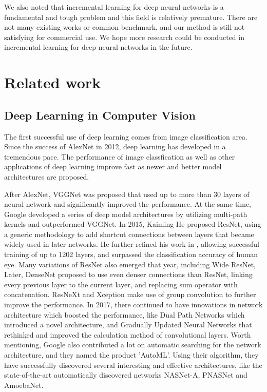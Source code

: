 We also noted that incremental learning for deep neural networks is a fundamental and tough problem and this field is relatively premature. There are not many existing works or common benchmark, and our method is still not satisfying for commercial use. We hope more research could be conducted in incremental learning for deep neural networks in the future.
\section{Related work}
\subsection{Deep Learning in Computer Vision}
The first successful use of deep learning comes from image classification area. Since the success of AlexNet\cite{krizhevsky2012imagenet} in 2012, deep learning has developed in a tremendous pace. The performance of image classfication as well as other applications of deep learning improve fast as newer and better model architectures are proposed.

After AlexNet, VGGNet\cite{simonyan2014very} was proposed that used up to more than 30 layers of neural network and significantly improved the performance. At the same time, Google developed a series of deep model architectures\cite{szegedy2015going,szegedy2016inception,szegedy2016rethinking} by utilizing multi-path kernels and outperformed VGGNet. In 2015, Kaiming He proposed ResNet\cite{he2016deep}, using a generic methodology to add shortcut connections between layers that became widely used in later networks. He further refined his work in \cite{he2016identity}, allowing successful training of up to 1202 layers, and surpassed the classification accuracy of human eye. Many variations of ResNet also emerged that year, including Wide ResNet, Later, DenseNet\cite{huang2017densely} proposed to use even denser connections than ResNet, linking every previous layer to the current layer, and replacing sum operator with concatenation. ResNeXt\cite{xie2017aggregated} and Xception\cite{chollet2016xception} make use of group convolution to further improve the performance. In 2017, there continued to have innovations in network architecture which boosted the performance, like Dual Path Networks\cite{chen2017dual} which introduced a novel architecture, and Gradually Updated Neural Networks\cite{qiao2017gradually} that rethinked and improved the calculation method of convolutional layers. Worth mentioning, Google also contributed a lot on automatic searching for the network architecture, and they named the product 'AutoML'. Using their algorithm, they have successfully discovered several interesting and effective architectures, like the state-of-the-art automatically discovered networks NASNet-A\cite{zoph2017learning}, PNASNet\cite{liu2017progressive} and AmoebaNet\cite{real2018regularized}.

